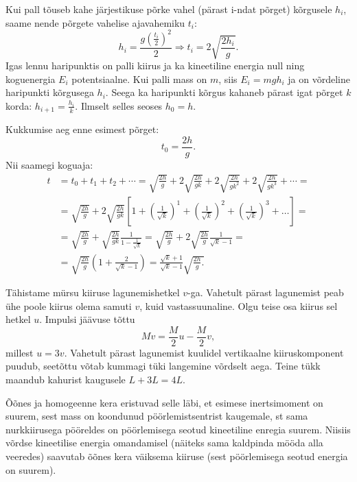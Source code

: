 \documentclass[10pt]{article}
\begin{document}
{%

\solu
Kui pall tõuseb kahe järjestikuse põrke vahel (pärast i-ndat põrget) kõrgusele $h_i$, saame nende põrgete vahelise ajavahemiku $t_i$:
\[
h_{i}=\frac{g\left(\frac{t_{i}}{2}\right)^{2}}{2} \Longrightarrow t_{i}=2 \sqrt{\frac{2 h_{i}}{g}}.
\]
Igas lennu haripunktis on palli kiirus ja ka kineetiline energia null ning koguenergia $E_i$ potentsiaalne. Kui palli mass on $m$, siis $E_i = mgh_i$ ja on võrdeline haripunkti kõrgusega $h_i$. Seega ka haripunkti kõrgus kahaneb pärast igat põrget $k$ korda: $h_{i+1} = \frac{h_i}{k}$. Ilmselt selles seoses $h_0 = h$.

Kukkumise aeg enne esimest põrget:
\[
t_0 = \frac{2h}{g}.
\]
Nii saamegi koguaja:
\[
\begin{aligned} 
	t &=t_{0}+t_{1}+t_{2}+\cdots=\sqrt{\frac{2 h}{g}}+2 \sqrt{\frac{2 h}{g k}} + 2 \sqrt{\frac{2 h}{g k^{2}}}+2 \sqrt{\frac{2 h}{g k^{3}}}+\cdots=\\ &=\sqrt{\frac{2 h}{g}}+2 \sqrt{\frac{2 h}{g k}}\left[1+\left(\frac{1}{\sqrt{k}}\right)^{1}+\left(\frac{1}{\sqrt{k}}\right)^{2}+\left(\frac{1}{\sqrt{k}}\right)^{3}+\ldots\right]=\\ &=\sqrt{\frac{2 h}{g}}+\sqrt{\frac{2 h}{g k}} \frac{1}{1-\frac{1}{\sqrt{k}}}=\sqrt{\frac{2 h}{g}}+2 \sqrt{\frac{2 h}{g}} \frac{1}{\sqrt{k}-1}=\\ &=\sqrt{\frac{2 h}{g}}\left(1+\frac{2}{\sqrt{k}-1}\right)=\frac{\sqrt{k}+1}{\sqrt{k}-1} \sqrt{\frac{2 h}{g}.} 
\end{aligned}
\]
\probend
\bigskip


\solu
Tähistame mürsu kiiruse lagunemishetkel $v$-ga. Vahetult pärast lagunemist peab ühe poole kiirus olema samuti $v$, kuid vastassuunaline. Olgu teise osa kiirus sel hetkel $u$. Impulsi jäävuse tõttu
\[
Mv = \frac{M}{2}u - \frac{M}{2}v,
\]
millest $u=3v$. Vahetult pärast lagunemist kuulidel vertikaalne kiiruskomponent puudub, seetõttu võtab kummagi tüki langemine võrdselt aega. Teine
tükk maandub kahurist kaugusele $L + 3L = 4L$.
\probend
\bigskip


\solu
Õõnes ja homogeenne kera eristuvad selle läbi, et esimese inertsimoment on suurem, sest
mass on koondunud pöörlemistsentrist kaugemale, st sama nurkkiirusega pööreldes on pöörlemisega seotud kineetiline enregia suurem. 
Niisiis võrdse kineetilise energia omandamisel (näiteks sama kaldpinda mööda alla veeredes) saavutab 
õõnes kera väiksema kiiruse (sest pöörlemisega seotud energia on suurem). 

}
\end{document}
